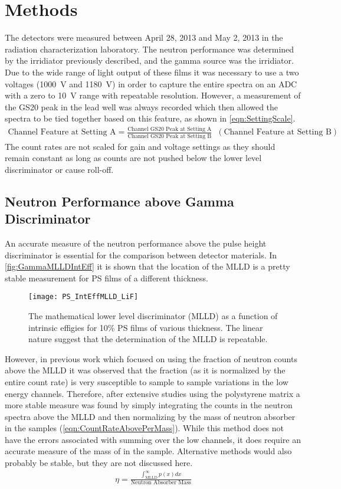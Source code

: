 \documentclass[onecolumn]{IEEEtran}
\begin{document}
\section{Methods}
The detectors were measured between April 28, 2013 and May 2, 2013 in the radiation characterization laboratory.
The neutron performance was determined by the  irridiator previously described, and the gamma source was the  irridiator.
Due to the wide range of light output of these films it was necessary to use a two voltages (\SI{1000}{\volt} and \SI{1180}{\volt}) in order to capture the entire spectra on an ADC with a zero to \SI{10}{\volt} range with repeatable resolution.
However, a measurement of the GS20 peak in the lead well was always recorded which then allowed the spectra to be tied together based on this feature, as shown in \autoref{eqn:SettingScale}.
\begin{align}
  \label{eqn:SettingScale}
  \text{Channel Feature at Setting A} = \frac{\text{Channel GS20 Peak at Setting A}}{\text{Channel GS20 Peak at Setting B}} \;\; \left( \text{Channel Feature at Setting B}\right)
\end{align}
The count rates are not scaled for gain and voltage settings as they should remain constant as long as counts are not pushed below the lower level discriminator or cause roll-off.
\subsection{Neutron Performance above Gamma Discriminator}
An accurate measure of the neutron performance above the pulse height discriminator is essential for the comparison between detector materials.
In \autoref{fig:GammaMLLDIntEff} it is shown that the location of the MLLD is a pretty stable measurement for PS films of a different thickness.
\begin{figure}
  \centering
  \texttt{[image: PS\_IntEffMLLD\_LiF]}
  \caption[Stability of Lower Level Discriminator]{The mathematical lower level discriminator (MLLD) as a function of intrinsic effigies for 10\% PS films of various thickness. The linear nature suggest that the determination of the MLLD is repeatable.}
  \label{fig:GammaMLLDIntEff}
\end{figure}
However, in previous work which focused on using the fraction of neutron counts above the MLLD it was observed that the fraction (as it is normalized by the entire count rate) is very susceptible to sample to sample variations in the low energy channels.
Therefore, after extensive studies using the polystyrene matrix a more stable measure was found by simply integrating the counts in the neutron spectra above the MLLD and then normalizing by the mass of neutron absorber in the samples (\autoref{eqn:CountRateAbovePerMass}).
While this method does not have the errors associated with summing over the low channels, it does require an accurate measure of the mass of  in the sample.
Alternative methods would also probably be stable, but they are not discussed here.
\begin{align}
\label{eqn:CountRateAbovePerMass}
\eta = \frac{\int_{\text{MLLD}}^\infty p(x)dx}{\text{Neutron Absorber Mass}}
\end{align}
\end{document}
